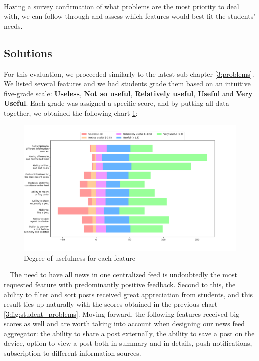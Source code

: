 ~

Having a survey confirmation of what problems are the most priority to deal with, we can follow through and assess which features would best fit the students' needs.

\subsection{Solutions} \label{3:solutions}

For this evaluation, we proceeded similarly to the latest sub-chapter \ref{3:problems}. We listed several features and we had students grade them based on an intuitive five-grade scale: \textbf{Useless}, \textbf{Not so useful}, \textbf{Relatively useful}, \textbf{Useful} and \textbf{Very Useful}. Each grade was assigned a specific score, and by putting all data together, we obtained the following chart \ref{3:fig:solutions}:

\begin{figure}[ht]
    \centering
         \includegraphics[height=0.42\textheight]{figures/charts/survey/survey-features-ranking-stacked.png}
    \caption{Degree of usefulness for each feature}
    \label{3:fig:solutions}
\end{figure}

~
The need to have all news in one centralized feed is undoubtedly the most requested feature with predominantly positive feedback. Second to this, the ability to filter and sort posts received great appreciation from students, and this result ties up naturally with the scores obtained in the previous chart \ref{3:fig:student_problems}. Moving forward, the following features received big scores as well and are worth taking into account when designing our news feed aggregator: the ability to share a post externally, the ability to save a post on the device, option to view a post both in summary and in details, push notifications, subscription to different information sources.

